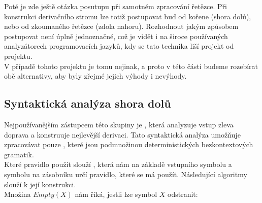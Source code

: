 Poté je zde ještě otázka posutupu při samotném zpracování řetězce.
Při konstrukci derivačního stromu lze totiž postupovat buď od kořene (shora dolů), nebo od
zkoumaného řetězce (zdola nahoru). Rozhodnout jakým způsobem postupovat není úplně jednoznačné,
což je vidět i na široce používaných analyzátorech programovacích jazyků,
kdy se tato technika liší projekt od projektu.\\

V případě tohoto projektu je tomu nejinak, a proto v této části budeme rozebírat
obě alternativy, aby byly zřejmé jejich výhody i nevýhody.

\subsection{Syntaktická analýza shora dolů}

Nejpoužívanějším zástupcem této skupiny je , která analyzuje
vstup zleva doprava a konstruuje nejlevější derivaci. Tato syntaktická analýza
umožňuje zpracovávat pouze ,
které jsou podmnožinou deterministických bezkontextových gramatik.\\

Které pravidlo použít slouží , která nám na základě
vstupního symbolu a symbolu na zásobníku určí pravidlo, které se má použít.
Následující algoritmy slouží k její konstrukci.\\

\noindent
Množina $Empty(X)$ nám říká, jestli lze symbol $X$ odstranit:\\
\begin{algorithm}[H]
  \caption{$Empty(X)$}

  \BlankLine
\end{algorithm}
\vspace{0.5cm}

